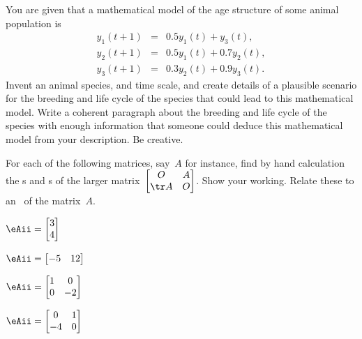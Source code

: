 \begin{exercise} \label{ex:} 
You are given that a mathematical model of the age structure of some animal population is
\begin{eqnarray*}
y_1(t+1)&=& 0.5y_1(t)+y_3(t),\\
y_2(t+1)&=& 0.5y_1(t)+0.7y_2(t),\\
y_3(t+1)&=& 0.3y_2(t)+0.9y_3(t).
\end{eqnarray*}
Invent an animal species, and time scale, and create details of a plausible scenario for the breeding and life cycle of the species that could lead to this mathematical model.  
Write a coherent paragraph about the breeding and life cycle of the species with enough information that someone could deduce this mathematical model from your description.  
Be creative.
\end{exercise}











\begin{exercise} \label{ex:} 
For each of the following matrices, say~\(A\) for instance, find by hand calculation the s and s of the larger matrix~\(\begin{bmatrix} O&A\\\tr A&O \end{bmatrix}\).
Show your working.
Relate these to an \svd\ of the matrix~\(A\).
\begin{parts}
\item \(\eAii=\begin{bmatrix} 3\\4 \end{bmatrix}\)

\item \(\eAii=\begin{bmatrix} -5&12 \end{bmatrix}\)

\item \(\eAii=\begin{bmatrix} 1&0\\0&-2 \end{bmatrix}\)

\item \(\eAii=\begin{bmatrix} 0&1\\-4&0 \end{bmatrix}\)

\end{parts}
\end{exercise}

